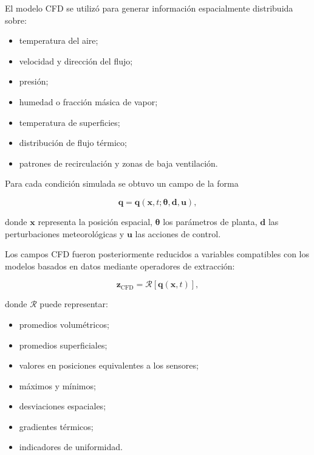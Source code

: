 El modelo CFD se utilizó para generar información espacialmente distribuida sobre:

\begin{itemize}
    \item temperatura del aire;
    \item velocidad y dirección del flujo;
    \item presión;
    \item humedad o fracción másica de vapor;
    \item temperatura de superficies;
    \item distribución de flujo térmico;
    \item patrones de recirculación y zonas de baja ventilación.
\end{itemize}

Para cada condición simulada se obtuvo un campo de la forma

\begin{equation}
\mathbf{q}
=
\mathbf{q}
\left(
\mathbf{x},
t;
\boldsymbol{\theta},
\mathbf{d},
\mathbf{u}
\right),
\label{eq:campo_cfd_sintetico}
\end{equation}

donde $\mathbf{x}$ representa la posición espacial, $\boldsymbol{\theta}$ los parámetros de planta, $\mathbf{d}$ las perturbaciones meteorológicas y $\mathbf{u}$ las acciones de control.

Los campos CFD fueron posteriormente reducidos a variables compatibles con los modelos basados en datos mediante operadores de extracción:

\begin{equation}
\mathbf{z}_{\mathrm{CFD}}
=
\mathcal{R}
\left[
\mathbf{q}
\left(
\mathbf{x},t
\right)
\right],
\label{eq:operador_reduccion_cfd}
\end{equation}

donde $\mathcal{R}$ puede representar:

\begin{itemize}
    \item promedios volumétricos;
    \item promedios superficiales;
    \item valores en posiciones equivalentes a los sensores;
    \item máximos y mínimos;
    \item desviaciones espaciales;
    \item gradientes térmicos;
    \item indicadores de uniformidad.
\end{itemize}

